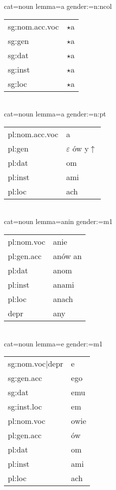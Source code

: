 \documentclass{article}
\begin{document}
\begin{multicols}{2}
cat=noun lemma=a gender:=n:ncol\\
\begin{tabular}{l|l}
sg:nom.acc.voc & $\star$a\\
sg:gen & $\star$a\\
sg:dat & $\star$a\\
sg:inst & $\star$a\\
sg:loc & $\star$a\\
\end{tabular}\\

cat=noun lemma=a gender:=n:pt\\
\begin{tabular}{l|l}
pl:nom.acc.voc & a\\
pl:gen & $\varepsilon$ ów y$\uparrow$\\
pl:dat & om\\
pl:inst & ami\\
pl:loc & ach\\
\end{tabular}\\

cat=noun lemma=anin gender:=m1\\
\begin{tabular}{l|l}
pl:nom.voc & anie\\
pl:gen.acc & anów an\\
pl:dat & anom\\
pl:inst & anami\\
pl:loc & anach\\
depr & any\\
\end{tabular}\\

cat=noun lemma=e gender:=m1\\
\begin{tabular}{l|l}
sg:nom.voc|depr & e\\
sg:gen.acc & ego\\
sg:dat & emu\\
sg:inst.loc & em\\
pl:nom.voc & owie\\
pl:gen.acc & ów\\
pl:dat & om\\
pl:inst & ami\\
pl:loc & ach\\
\end{tabular}\\


\end{multicols}
\end{document}
